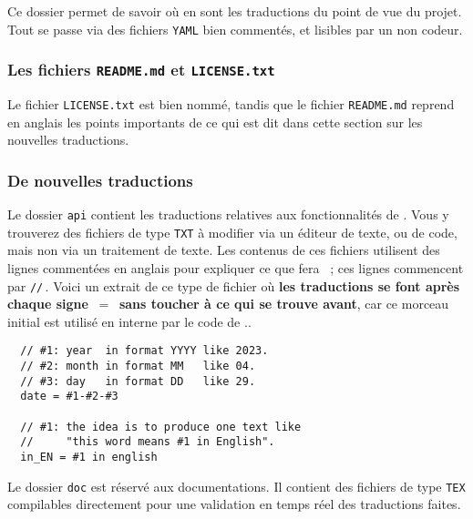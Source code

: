 Ce dossier permet de savoir où en sont les traductions du point de vue du projet. Tout se passe via des fichiers \verb#YAML# bien commentés, et lisibles par un non codeur.



\subsubsection{Les fichiers \texttt{README.md} et \texttt{LICENSE.txt}}

Le fichier \texttt{LICENSE.txt} est bien nommé, tandis que le fichier \texttt{README.md} reprend en anglais les points importants de ce qui est dit dans cette section sur les nouvelles traductions.



\subsubsection{De nouvelles traductions}
\label{tutodoc-contrib-translate}

\begin{tdocimp}
    Le dossier \verb#api# contient les traductions relatives aux fonctionnalités de \thisproj.
    Vous y trouverez des fichiers de type \verb#TXT# à modifier via un éditeur de texte, ou de code, mais non via un traitement de texte.
    Les contenus de ces fichiers utilisent des lignes commentées en anglais pour expliquer ce que fera \thisproj\ ; ces lignes commencent par \verb#//#\,. Voici un extrait de ce type de fichier où \textbf{les traductions se font après chaque signe \,$=$\, sans toucher à ce qui se trouve avant}, car ce morceau initial est utilisé en interne par le code de \thisproj..

    \tdocsep
    \vspace{-10pt}
    \begin{verbatim}
  // #1: year  in format YYYY like 2023.
  // #2: month in format MM   like 04.
  // #3: day   in format DD   like 29.
  date = #1-#2-#3

  // #1: the idea is to produce one text like
  //     "this word means #1 in English".
  in_EN = #1 in english\end{verbatim}
\end{tdocimp}


\begin{tdocnote}
    Le dossier \verb#doc# est réservé aux documentations. Il contient des fichiers de type \verb#TEX# compilables directement pour une validation en temps réel des traductions faites.
\end{tdocnote}


